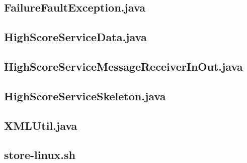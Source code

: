 \documentclass[a4paper, 12pt]{article}
\begin{document}
\newpage
\subsection{FailureFaultException.java}\label{FailureFaultException.java}
\begin{footnotesize}
  
\end{footnotesize}

\newpage
\subsection{HighScoreServiceData.java}\label{HighScoreServiceData.java}
\begin{footnotesize}
  
\end{footnotesize}

\newpage
\subsection{HighScoreServiceMessageReceiverInOut.java}\label{HighScoreServiceMessageReceiverInOut.java}
\begin{footnotesize}
  
\end{footnotesize}

\newpage
\subsection{HighScoreServiceSkeleton.java}\label{HighScoreServiceSkeleton.java}
\begin{footnotesize}
  
\end{footnotesize}

\newpage
\subsection{XMLUtil.java}\label{XMLUtil.java}
\begin{footnotesize}
  
\end{footnotesize}

\newpage
\subsection{store-linux.sh}\label{store-linux.sh}
\begin{footnotesize}
  
\end{footnotesize}
\end{document}
